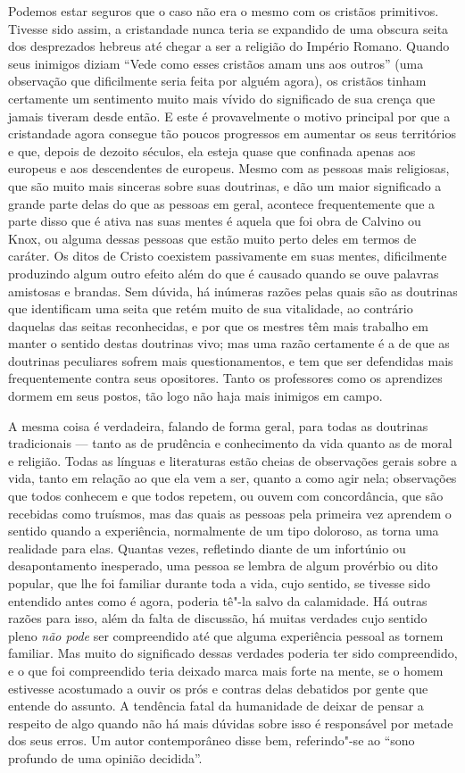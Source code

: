 Podemos estar seguros que o caso não era o mesmo com os cristãos
primitivos. Tivesse sido assim, a cristandade nunca teria se expandido
de uma obscura seita dos desprezados hebreus até chegar a ser a
religião do Império Romano. Quando seus inimigos diziam ``Vede como
esses cristãos amam uns aos outros'' (uma observação que dificilmente
seria feita por alguém agora), os cristãos tinham certamente um
sentimento muito mais vívido do significado de sua crença que jamais
tiveram desde então. E este é provavelmente o motivo principal por que a
cristandade agora consegue tão poucos progressos em aumentar os seus
territórios e que, depois de dezoito séculos, ela esteja quase que
confinada apenas aos europeus e aos descendentes de europeus. Mesmo com
as pessoas mais religiosas, que são muito mais sinceras sobre
suas doutrinas, e dão um maior significado a grande parte delas do que
as pessoas em geral, acontece frequentemente que a parte disso que é
ativa nas suas mentes é aquela que foi obra de Calvino ou Knox, ou
alguma dessas pessoas que estão muito perto deles em termos de
caráter. Os ditos de Cristo coexistem passivamente em suas mentes,
dificilmente produzindo algum outro efeito além do que é causado quando
se ouve palavras amistosas e brandas. Sem dúvida, há inúmeras razões
pelas quais são as doutrinas que identificam uma seita que retém muito
de sua vitalidade, ao contrário daquelas das seitas reconhecidas, e
por que os mestres têm mais trabalho em manter o sentido destas
doutrinas vivo; mas uma razão certamente é a de que as doutrinas
peculiares sofrem mais questionamentos, e tem que ser defendidas mais
frequentemente contra seus opositores. Tanto os professores
como os aprendizes dormem em seus postos, tão logo não haja mais inimigos em campo. 

A mesma coisa é verdadeira, falando de forma geral, para todas as
doutrinas tradicionais --- tanto as de prudência e conhecimento da vida
quanto as de moral e religião. Todas as línguas e literaturas estão
cheias de observações gerais sobre a vida, tanto em relação ao que ela
vem a ser, quanto a como agir nela; observações que todos conhecem e
que todos repetem, ou ouvem com concordância, que são recebidas como
truísmos, mas das quais as pessoas pela primeira vez aprendem o sentido
quando a experiência, normalmente de um tipo doloroso, as torna uma
realidade para elas. Quantas vezes, refletindo diante de um infortúnio
ou desapontamento inesperado, uma pessoa se lembra de algum provérbio
ou dito popular, que lhe foi familiar durante toda a vida, cujo
sentido, se tivesse sido entendido antes como é agora, poderia tê"-la
salvo da calamidade. Há outras razões para isso, além da falta de
discussão, há muitas verdades cujo sentido pleno \textit{não pode} ser
compreendido até que alguma experiência pessoal as tornem familiar. Mas
muito do significado dessas verdades poderia ter sido compreendido, e o
que foi compreendido teria deixado marca mais forte na mente, se o
homem estivesse acostumado a ouvir os prós e contras delas debatidos por
gente que entende do assunto. A tendência fatal da
humanidade de deixar de pensar a respeito de algo quando não há
mais dúvidas sobre isso é responsável por metade dos seus erros. 
Um autor contemporâneo disse bem, referindo"-se ao 
``sono profundo de uma opinião decidida''. 

